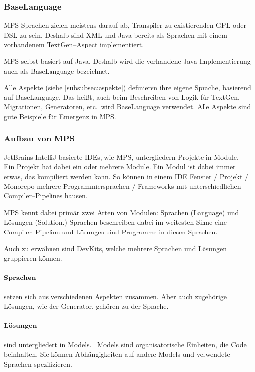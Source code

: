\subsubsection{BaseLanguage}
\ac{MPS} Sprachen zielen meistens darauf ab, Transpiler zu existierenden \ac{GPL} oder \ac{DSL} zu sein.
Deshalb sind \ac{XML} und Java bereits als Sprachen mit einem vorhandenem TextGen--Aspect implementiert.

\ac{MPS} selbst basiert auf Java.
Deshalb wird die vorhandene Java Implementierung auch als BaseLanguage bezeichnet.

Alle Aspekte (siehe \autoref{subsubsec:aspekte}) definieren ihre eigene Sprache, basierend auf BaseLanguage.
Das heißt, auch beim Beschreiben von Logik für TextGen, Migrationen, Generatoren, etc.\ wird BaseLanguage verwendet.
Alle Aspekte sind gute Beispiele für Emergenz in \ac{MPS}.

\subsubsection{Aufbau von \acs{MPS}}
JetBrains IntelliJ basierte \acp{IDE}, wie \ac{MPS}, untergliedern Projekte in Module.~\autocite{jetbrains-sro-no-dateD}
Ein Projekt hat dabei ein oder mehrere Module.
Ein Modul ist dabei immer etwas, das kompiliert werden kann.
So können in einem \ac{IDE} Fenster / Projekt / Monorepo mehrere Programmiersprachen / Frameworks mit unterschiedlichen Compiler--Pipelines hausen.

\ac{MPS} kennt dabei primär zwei Arten von Modulen:
Sprachen (Language) und Lösungen (Solution.)
Sprachen beschreiben dabei im weitesten Sinne eine Compiler--Pipeline und Lösungen sind Programme in diesen Sprachen.

Auch zu erwähnen sind DevKits, welche mehrere Sprachen und Lösungen gruppieren können.

\paragraph{Sprachen} setzen sich aus verschiedenen Aspekten zusammen.
Aber auch zugehörige Lösungen, wie der Generator, gehören zu der Sprache.

\paragraph{Lösungen} sind untergliedert in Models.~\autocite{jetbrains-sro-no-dateA}
Models sind organisatorische Einheiten, die Code beinhalten.
Sie können Abhängigkeiten auf andere Models und verwendete Sprachen spezifizieren.

